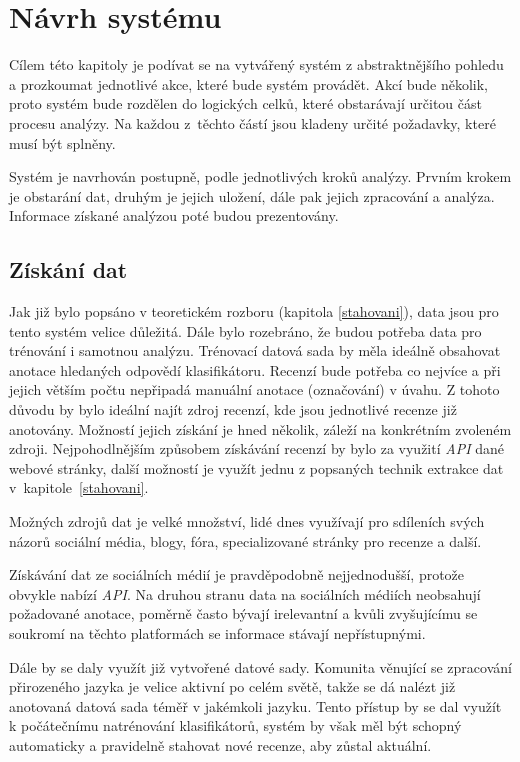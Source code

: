 \chapter{Návrh systému}
\label{navrh}
Cílem této kapitoly je podívat se na vytvářený systém z abstraktnějšího pohledu a prozkoumat jednotlivé akce, které bude systém provádět. Akcí bude několik, proto systém bude rozdělen do logických celků, které obstarávají určitou část procesu analýzy. Na každou z~těchto částí jsou kladeny určité požadavky, které musí být splněny. 

Systém je navrhován postupně, podle jednotlivých kroků analýzy. Prvním krokem je obstarání dat, druhým je jejich uložení, dále pak jejich zpracování a analýza. Informace získané analýzou poté budou prezentovány. 

\section{Získání dat}
Jak již bylo popsáno v teoretickém rozboru (kapitola \ref{stahovani}), data jsou pro tento systém velice důležitá. Dále bylo rozebráno, že budou potřeba data pro trénování i samotnou analýzu. Trénovací datová sada by měla ideálně obsahovat anotace hledaných odpovědí klasifikátoru. Recenzí bude potřeba co nejvíce a při jejich větším počtu nepřipadá manuální anotace (označování) v úvahu. Z tohoto důvodu by bylo ideální najít zdroj recenzí, kde jsou jednotlivé recenze již anotovány. Možností jejich získání je hned několik, záleží na konkrétním zvoleném zdroji. Nejpohodlnějším způsobem získávání recenzí by bylo za využití \emph{API} dané webové stránky, další možností je využít jednu z popsaných technik extrakce dat v~kapitole~\ref{stahovani}. 

Možných zdrojů dat je velké množství, lidé dnes využívají pro sdíleních svých názorů sociální média, blogy, fóra, specializované stránky pro recenze a další. 

Získávání dat ze sociálních médií je pravděpodobně nejjednodušší, protože obvykle nabízí \emph{API}. Na druhou stranu data na sociálních médiích neobsahují požadované anotace, poměrně často bývají irelevantní a kvůli zvyšujícímu se soukromí na těchto platformách se informace stávají nepřístupnými. 

Dále by se daly využít již vytvořené datové sady. Komunita věnující se zpracování přirozeného jazyka je velice aktivní po celém světě, takže se dá nalézt již anotovaná datová sada téměř v jakémkoli jazyku. Tento přístup by se dal využít k počátečnímu natrénování klasifikátorů, systém by však měl být schopný automaticky a pravidelně stahovat nové recenze, aby zůstal aktuální. 

